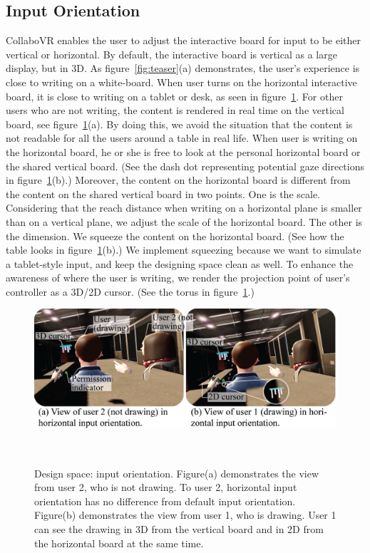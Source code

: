\documentclass{sigchi}
\begin{document}
\subsection{Input Orientation}
CollaboVR enables the user to adjust the interactive board for input to be either vertical or horizontal. By default, the interactive board is vertical as a large display, but in 3D. As figure~\ref{fig:teaser}(a) demonstrates, the user's experience is close to writing on a white-board. When user turns on the horizontal interactive board, it is close to writing on a tablet or desk, as seen in figure~\ref{fig:inputorientation}. For other users who are not writing, the content is rendered in real time on the vertical board, see figure~\ref{fig:inputorientation}(a). By doing this, we avoid the situation that the content is not readable for all the users around a table in real life. When user is writing on the horizontal board, he or she is free to look at the personal horizontal board or the shared vertical board. (See the dash dot representing potential gaze directions in figure~\ref{fig:inputorientation}(b).) Moreover, the content on the horizontal board is different from the content on the shared vertical board in two points. One is the scale. Considering that the reach distance when writing on a horizontal plane is smaller than on a vertical plane, we adjust the scale of the horizontal board. The other is the dimension. We squeeze the content on the horizontal board. (See how the table looks in figure~\ref{fig:inputorientation}(b).) We implement squeezing because we want to simulate a tablet-style input, and keep the designing space clean as well. To enhance the awareness of where the user is writing, we render the projection point of user's controller as a 3D/2D cursor. (See the torus in figure~\ref{fig:inputorientation}.)

\begin{figure}[tb!]
 \centering
 \includegraphics[width=0.95\columnwidth]{Figure4.png}
 \caption{Design space: input orientation. Figure(a) demonstrates the view from user 2, who is not drawing. To user 2, horizontal input orientation has no difference from default input orientation. Figure(b) demonstrates the view from user 1, who is drawing. User 1 can see the drawing in 3D from the vertical board and in 2D from the horizontal board at the same time.
 }~\label{fig:inputorientation}
\end{figure}
\end{document}
